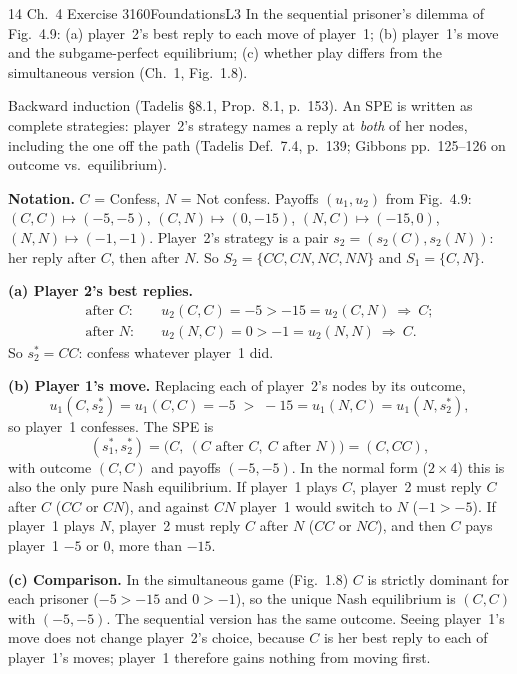 \begin{exsol}{14}{\MG{} Ch.~4 Exercise 3}{160}{Foundations}{L3}
\asked In the sequential prisoner's dilemma of Fig.~4.9: (a) player~2's best reply to each
move of player~1; (b) player~1's move and the subgame-perfect equilibrium; (c) whether play
differs from the simultaneous version (Ch.~1, Fig.~1.8).

\method Backward induction (Tadelis \S8.1, Prop.~8.1, p.~153). An SPE is written as complete
strategies: player~2's strategy names a reply at \emph{both} of her nodes, including the one off
the path (Tadelis Def.~7.4, p.~139; Gibbons pp.~125--126 on outcome vs.\ equilibrium).

\solution
\textbf{Notation.} $C$ = Confess, $N$ = Not confess. Payoffs $(u_1,u_2)$ from Fig.~4.9:
$(C,C)\mapsto(-5,-5)$, $(C,N)\mapsto(0,-15)$, $(N,C)\mapsto(-15,0)$, $(N,N)\mapsto(-1,-1)$.
Player~2's strategy is a pair $s_2 = (s_2(C), s_2(N))$: her reply after $C$, then after $N$. So
$S_2 = \{CC, CN, NC, NN\}$ and $S_1 = \{C, N\}$.

\textbf{(a) Player 2's best replies.}
\begin{align*}
  \text{after } C:&\quad u_2(C,C) = -5 > -15 = u_2(C,N) \ \Rightarrow\ C;\\
  \text{after } N:&\quad u_2(N,C) = 0 > -1 = u_2(N,N) \ \Rightarrow\ C .
\end{align*}
So $s_2^* = CC$: confess whatever player~1 did.

\textbf{(b) Player 1's move.} Replacing each of player~2's nodes by its outcome,
\[
  u_1(C, s_2^*) = u_1(C,C) = -5 \;>\; -15 = u_1(N,C) = u_1(N, s_2^*),
\]
so player~1 confesses. The SPE is
\[
  (s_1^*, s_2^*) = \bigl(C,\ (C \text{ after } C,\ C \text{ after } N)\bigr) = (C, CC),
\]
with outcome $(C,C)$ and payoffs $(-5,-5)$. In the normal form ($2\times4$) this is also the
only pure Nash equilibrium. If player~1 plays $C$, player~2 must reply $C$ after $C$ ($CC$ or
$CN$), and against $CN$ player~1 would switch to $N$ ($-1 > -5$). If player~1 plays $N$,
player~2 must reply $C$ after $N$ ($CC$ or $NC$), and then $C$ pays player~1 $-5$ or $0$, more
than $-15$.

\textbf{(c) Comparison.} In the simultaneous game (Fig.~1.8) $C$ is strictly dominant for each
prisoner ($-5 > -15$ and $0 > -1$), so the unique Nash equilibrium is $(C,C)$ with $(-5,-5)$. The
sequential version has the same outcome. Seeing player~1's move does not change player~2's
choice, because $C$ is her best reply to each of player~1's moves; player~1 therefore gains
nothing from moving first.


\end{exsol}
